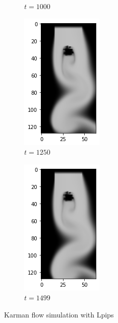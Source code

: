 \documentclass[a4paper,12pt,twoside]{report}
\begin{document}
\begin{figure}
\begin{subfigure}{0.18\textwidth}
		\caption{$t=1000$}
	\end{subfigure}
	\begin{subfigure}{0.18\textwidth}
		\centering
		\includegraphics[scale=0.5]{karmanflow/lpips_density_001250.png}
		\caption{$t=1250$}
	\end{subfigure}
	\begin{subfigure}{0.18\textwidth}
		\centering
		\includegraphics[scale=0.5]{karmanflow/lpips_density_001499.png}
		\caption{$t=1499$}
	\end{subfigure}
	\caption{Karman flow simulation with Lpips}
	\label{sol karman high lpips}
\end{figure}
\end{document}
